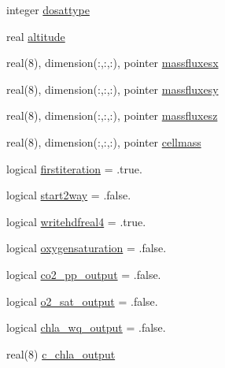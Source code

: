 \begin{DoxyCompactItemize}
integer \mbox{\hyperlink{structmodulewaterproperties_1_1t__waterproperties_ac38087d68cb923b65acd1c9815236051}{dosattype}}
\item 
real \mbox{\hyperlink{structmodulewaterproperties_1_1t__waterproperties_a2e6b8eb5dcfdef3132cbc141064e2c7b}{altitude}}
\item 
real(8), dimension(\+:,\+:,\+:), pointer \mbox{\hyperlink{structmodulewaterproperties_1_1t__waterproperties_a1ba31f63064313ddcfe31a7813686422}{massfluxesx}}
\item 
real(8), dimension(\+:,\+:,\+:), pointer \mbox{\hyperlink{structmodulewaterproperties_1_1t__waterproperties_af385f406fee5343b513bfd359b87086d}{massfluxesy}}
\item 
real(8), dimension(\+:,\+:,\+:), pointer \mbox{\hyperlink{structmodulewaterproperties_1_1t__waterproperties_a0c63d1b5eb47d89074c1d605d977e1f8}{massfluxesz}}
\item 
real(8), dimension(\+:,\+:,\+:), pointer \mbox{\hyperlink{structmodulewaterproperties_1_1t__waterproperties_af25a74dadb8d25da49049eab29d8cf1e}{cellmass}}
\item 
logical \mbox{\hyperlink{structmodulewaterproperties_1_1t__waterproperties_ae0351c34c606e3fc62c8d392ba44f0f4}{firstiteration}} = .true.
\item 
logical \mbox{\hyperlink{structmodulewaterproperties_1_1t__waterproperties_a0359e38690894db927f109d8acbebef3}{start2way}} = .false.
\item 
logical \mbox{\hyperlink{structmodulewaterproperties_1_1t__waterproperties_a3fb14c0c6f0236dde822feaf8036c036}{writehdfreal4}} = .true.
\item 
logical \mbox{\hyperlink{structmodulewaterproperties_1_1t__waterproperties_ac8f08265ee4084517b699688e2e23e92}{oxygensaturation}} = .false.
\item 
logical \mbox{\hyperlink{structmodulewaterproperties_1_1t__waterproperties_a4ffac99f661578e8967c10853210c016}{co2\+\_\+pp\+\_\+output}} = .false.
\item 
logical \mbox{\hyperlink{structmodulewaterproperties_1_1t__waterproperties_a7fe804fb42ddca0559d2b69ef3547b25}{o2\+\_\+sat\+\_\+output}} = .false.
\item 
logical \mbox{\hyperlink{structmodulewaterproperties_1_1t__waterproperties_a2090683c20a11f01cb25e9e5f22c4cb8}{chla\+\_\+wq\+\_\+output}} = .false.
\item 
real(8) \mbox{\hyperlink{structmodulewaterproperties_1_1t__waterproperties_af946811c189644bd4405aced7533a82d}{c\+\_\+chla\+\_\+output}}
\item 

\end{DoxyCompactItemize}
